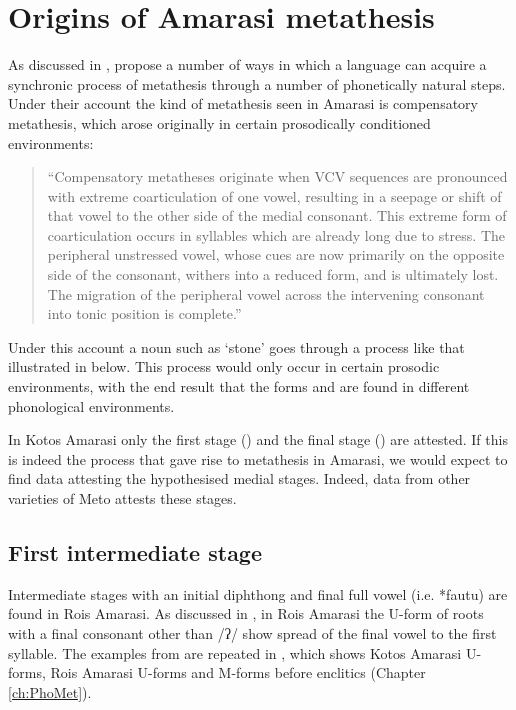 \section{Origins of Amarasi metathesis}\label{sec:OriMetAma}
As discussed in , \cite{blga98,blga04} propose
a number of ways in which a language can acquire a synchronic process
of metathesis through a number of phonetically natural steps.
Under their account the kind of metathesis seen
in Amarasi is compensatory metathesis,
which arose originally in certain prosodically conditioned environments:

\begin{quote}
``Compensatory metatheses originate when VCV sequences
are pronounced with extreme coarticulation of one vowel,
resulting in a seepage or shift of that vowel to the other side of the medial consonant.
This extreme form of coarticulation occurs in syllables which are already long due to stress.
The peripheral unstressed vowel, whose cues are now primarily on the opposite side of the consonant,
withers into a reduced form, and is ultimately lost.
The migration of the peripheral vowel across the intervening
consonant into tonic position is complete.'' \hfill\citep[529]{blga98}
\end{quote}

Under this account a noun such as  `stone' goes 
through a process like that illustrated in  below.
This process would only occur in certain prosodic environments,
with the end result that the forms  and 
are found in different phonological environments.

\begin{exe}
	\label{ex:fautu}
\end{exe}

In Kotos Amarasi only the first stage ()
and the final stage () are attested.
If this is indeed the process that gave rise to metathesis in Amarasi,
we would expect to find data attesting the hypothesised medial stages.
Indeed, data from other varieties of Meto attests these stages.

\subsection{First intermediate stage}
Intermediate stages with an initial diphthong and final full vowel
(i.e. *fautu) are found in Ro{\Q}is Amarasi.
As discussed in ,
in Ro{\Q}is Amarasi the U-form of roots with a final consonant other than /ʔ/
show spread of the final vowel to the first syllable.
The examples from 
are repeated in ,
which shows Kotos Amarasi U-forms, Ro{\Q}is Amarasi U-forms
and M-forms before enclitics (Chapter \ref{ch:PhoMet}).

